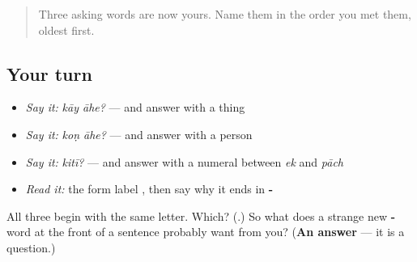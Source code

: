 \begin{quote}
Three asking words are now yours. Name them in the order you met them, oldest first.
\end{quote}

\subsection*{Your turn}
\begin{itemize}
\raggedright
  \item \emph{Say it:} \emph{kāy āhe?} — and answer with a thing
  \item \emph{Say it:} \emph{koṇ āhe?} — and answer with a person
  \item \emph{Say it:} \emph{kitī?} — and answer with a numeral between \emph{ek} and \emph{pāch}
  \item \emph{Read it:} the form label \textbf{ }, then say why it ends in \textbf{-}
\end{itemize}

\begin{tcolorbox}[breakable,colback=teal!4,colframe=teal!35!black,title={Before you move on}]
All three begin with the same letter. Which? (\textbf{}.) So what does a strange new \textbf{-} word at the front of a sentence probably want from you? (\textbf{An answer} — it is a question.)
\end{tcolorbox}
